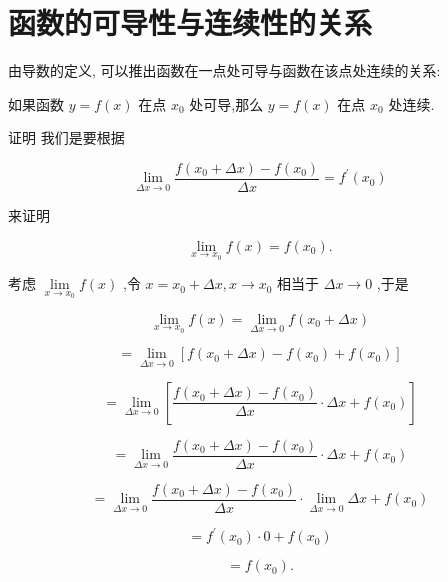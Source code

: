 \documentclass[lang=cn,newtx,10pt,scheme=chinese]{elegantbook}
\begin{document}
\section{函数的可导性与连续性的关系}

由导数的定义, 可以推出函数在一点处可导与函数在该点处连续的关系:

\begin{conclusion}
	如果函数 \(y = f\left( x\right)\) 在点 \({x}_{0}\) 处可导,那么 \(y = f\left( x\right)\) 在点 \({x}_{0}\) 处连续.
\end{conclusion}

证明 我们是要根据

\[
\mathop{\lim }\limits_{{{\Delta x} \rightarrow 0}}\frac{f\left( {{x}_{0} + {\Delta x}}\right) - f\left( {x}_{0}\right) }{\Delta x} = {f}^{\prime }\left( {x}_{0}\right)
\]

来证明

\[
\mathop{\lim }\limits_{{x \rightarrow {x}_{0}}}f\left( x\right) = f\left( {x}_{0}\right) .
\]

考虑 \(\mathop{\lim }\limits_{{x \rightarrow {x}_{0}}}f\left( x\right)\) ,令 \(x = {x}_{0} + {\Delta x},x \rightarrow {x}_{0}\) 相当于 \({\Delta x} \rightarrow 0\) ,于是

\[
\mathop{\lim }\limits_{{x \rightarrow {x}_{0}}}f\left( x\right) = \mathop{\lim }\limits_{{{\Delta x} \rightarrow 0}}f\left( {{x}_{0} + {\Delta x}}\right)
\]

\[
= \mathop{\lim }\limits_{{{\Delta x} \rightarrow 0}}\left\lbrack {f\left( {{x}_{0} + {\Delta x}}\right) - f\left( {x}_{0}\right) + f\left( {x}_{0}\right) }\right\rbrack
\]

\[
= \mathop{\lim }\limits_{{{\Delta x} \rightarrow 0}}\left\lbrack {\frac{f\left( {{x}_{0} + {\Delta x}}\right) - f\left( {x}_{0}\right) }{\Delta x} \cdot {\Delta x} + f\left( {x}_{0}\right) }\right\rbrack
\]

\[
= \mathop{\lim }\limits_{{{\Delta x} \rightarrow 0}}\frac{f\left( {{x}_{0} + {\Delta x}}\right) - f\left( {x}_{0}\right) }{\Delta x} \cdot {\Delta x} + f\left( {x}_{0}\right)
\]

\[
= \mathop{\lim }\limits_{{{\Delta x} \rightarrow 0}}\frac{f\left( {{x}_{0} + {\Delta x}}\right) - f\left( {x}_{0}\right) }{\Delta x} \cdot \mathop{\lim }\limits_{{{\Delta x} \rightarrow 0}}{\Delta x} + f\left( {x}_{0}\right)
\]

\[
= {f}^{\prime }\left( {x}_{0}\right) \cdot 0 + f\left( {x}_{0}\right)
\]

\[
= f\left( {x}_{0}\right) \text{.}
\]
\end{document}
